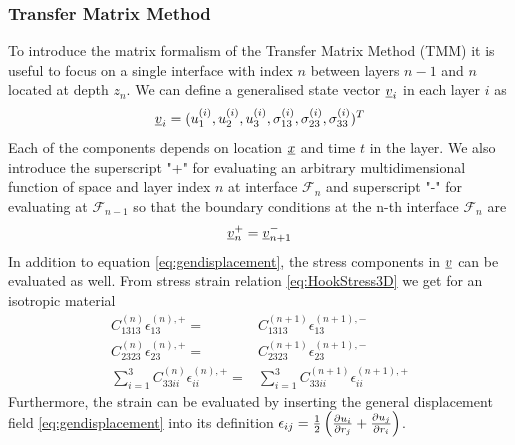 \subsubsection{Transfer Matrix Method}
To introduce the matrix formalism of the Transfer Matrix Method (TMM) it is
useful to focus on a single interface with index $n$ between layers $n-1$ and
$n$ located at depth $z_n$. We can define a generalised state vector
$\underline{v}_i$  in each layer $i$ as
\cite{Fomenko2014}
\begin{equation}
    \underline{v}_i = (u^{(i)}_1, u^{(i)}_2, u^{(i)}_3, \sigma^{(i)}_{13},
    \sigma^{(i)}_{23}, \sigma^{(i)}_{33})^T
\end{equation}
Each of the components depends on location $\underline{x}$ and time $t$ in the
layer. We also introduce the superscript "+" for evaluating an arbitrary
multidimensional function of space and layer index $n$ at interface
$\mathcal{F}_n$ and superscript "-" for evaluating at $\mathcal{F}_{n-1}$ so
that the boundary conditions at the n-th interface $\mathcal{F}_n$ are
\begin{equation}
    \underline{v}_n^+ = \underline{v}_{n+1}^-
\end{equation}
In addition to equation \ref{eq:gendisplacement}, the stress components in
$\underline{v}$ can be evaluated as well. From stress strain relation
\ref{eq:HookStress3D} we get for an isotropic material
\begin{align}
    C_{1313}^{(n)}\epsilon_{13}^{(n),+} =                     &
    C_{1313}^{(n+1)}\epsilon_{13}^{(n+1),-}                     \\[5pt]
    C_{2323}^{(n)}\epsilon_{23}^{(n),+} =                     &
    C_{2323}^{(n+1)}\epsilon_{23}^{(n+1),-}                     \\
    \sum\limits_{i=1}^3 C_{33ii}^{(n)}\epsilon_{ii}^{(n),+} = &
    \sum\limits_{i=1}^3 C_{33ii}^{(n+1)}\epsilon_{ii}^{(n+1),+}
\end{align} %
Furthermore, the strain can be evaluated by inserting the general displacement
field \ref{eq:gendisplacement} into its definition $\epsilon_{ij} = \frac{1}{2}
    \left( \frac{\partial u_i}{\partial r_j} +\frac{\partial u_j}{\partial r_i} \right)$.


